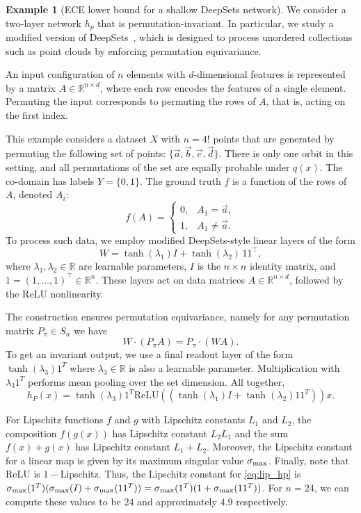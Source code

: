 \documentclass[10pt]{article} %
\newcommand{\R}{\mathbb{R}}
\theoremstyle{definition}
\newtheorem{example}{Example}
\begin{document}
\begin{example}[ECE lower bound for a shallow DeepSets network] 
\label{ex:deep_sets} 
We consider a two-layer network $h_p$ that is permutation-invariant. In particular, we study a modified version of DeepSets~\citep{zaheer2017deep}, 
which is designed to process unordered collections such as point clouds by enforcing permutation equivariance. 

An input configuration of $n$ elements with $d$-dimensional features is represented by a matrix 
$A \in \R^{n \times d}$, where each row encodes the features of a single element. 
Permuting the input corresponds to permuting the rows of $A$, that is, acting on the first index. 

This example considers a dataset $X$ with $n = 4!$ points that are generated by permuting the following set of points: $\{\vec{a}, \vec{b}, \vec{c}, \vec{d}\}$. There is only one orbit in this setting, and all permutations of the set are equally probable under $q(x)$. The co-domain has labels $Y = \{0, 1\}$. The ground truth $f$ is a function of the rows of $A$, denoted $A_i$:
\begin{equation*}
 f(A) = \begin{cases}
     0, & A_1 = \vec{a}, \\
     1, & A_1 \neq \vec{a}.
 \end{cases}   
\end{equation*}
%
To process such data, we employ modified DeepSets-style linear layers of the form
\[
W = \tanh(\lambda_1) I + \tanh(\lambda_2) \, 11^\top ,
\]
where $\lambda_1, \lambda_2 \in \R$ are learnable parameters, 
$I$ is the $n \times n$ identity matrix, 
and $1 = (1,\dots,1)^\top \in \R^n$. 
These layers act on data matrices $A \in \R^{n \times d}$, followed by the ReLU nonlinearity. 

The construction ensures permutation equivariance, 
namely for any permutation matrix $P_\pi \in S_n$ we have
\[
W \cdot (P_\pi A) = P_\pi \cdot (W A).
\]
To get an invariant output, we use a final readout layer of the form $\tanh(\lambda_3) 1^T$ where $\lambda_3 \in \mathbb{R}$ is also a learnable parameter. Multiplication with $\lambda_3 1^T$ performs mean pooling over the set dimension. All together, 
\begin{equation}
    h_P(x) = \tanh(\lambda_3)1^T\text{ReLU}((\tanh(\lambda_1) I + \tanh(\lambda_2) 11^T))x. \label{eq:lip_hp}
\end{equation}

For Lipschitz functions $f$ and $g$ with Lipschitz constants $L_1$ and $L_2$, the composition $f(g(x))$ has Lipschitz constant $L_2L_1$ and the sum $f(x) + g(x)$ has Lipschitz constant $L_1 + L_2$. Moreover, the Lipschitz constant for a linear map is given by its maximum singular value $\sigma_{\rm max}$. Finally, note that ReLU is $1-$Lipschitz. Thus, the Lipschitz constant for  \cref{eq:lip_hp} is $ \sigma_{\rm max}(1^T)(\sigma_{\rm max}(I) + \sigma_{\rm max}(11^T)) = \sigma_{\rm max}(1^T)(1 + \sigma_{\rm max}(11^T))$. For $n = 24$, we can compute these values to be $24$ and approximately $4.9$ respectively.


\end{example}
\end{document}
